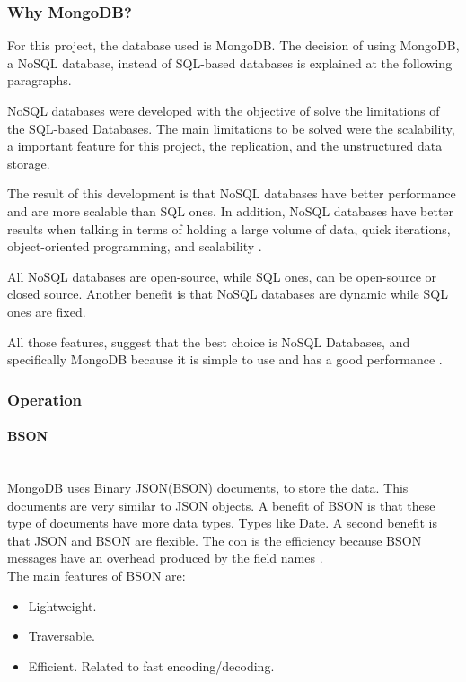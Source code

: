 \documentclass[12pt, a4paper,twoside]{tesi_upf}
\begin{document}
            \subsubsection{Why MongoDB?}
            
            For this project, the database used is MongoDB. The decision of using MongoDB, a NoSQL database, instead of SQL-based databases is explained at the following paragraphs.
            
           NoSQL databases were developed with the objective of solve the limitations of the SQL-based Databases. The main limitations to be solved were the scalability, a important feature for this project, the replication, and the unstructured data storage.
           
           The result of this development is that NoSQL databases have better performance and are more scalable than SQL ones. In addition, NoSQL databases have better results when talking in terms of holding a large volume of data, quick iterations, object-oriented programming, and scalability \cite{nosql}.

            All NoSQL databases are open-source, while SQL ones, can be open-source or closed source. Another benefit is that NoSQL databases are dynamic while SQL ones are fixed.
        
            All those features, suggest that the best choice is NoSQL Databases, and specifically MongoDB because it is simple to use and has a good performance \cite{nosql}.

            \subsubsection{Operation}
            \paragraph{BSON}\\
            MongoDB uses Binary JSON(BSON) documents, to store the data. This documents are very similar to JSON objects. A benefit of BSON is that these type of documents have more data types. Types like Date. A second benefit is that JSON and BSON are flexible. The con is the efficiency because BSON messages have an overhead produced by the field names \cite{bson}.\\
            
            The main features of BSON are:
            \begin{itemize}
            \item Lightweight.
            \item Traversable.
            \item Efficient. Related to fast encoding/decoding.
            \end{itemize}
            
\end{document}

